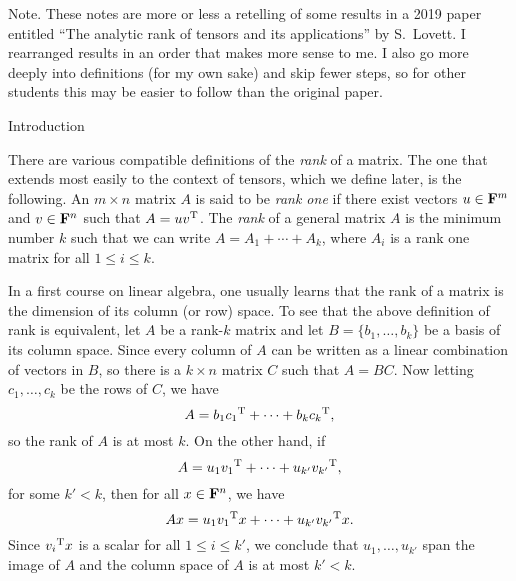 


\def\FF{{\bf F}}
\def\T{{\rm T}}
\def\bias{\op{\rm bias}}
\def\prk{\op{\rm prk}}
\def\ark{\op{\rm ark}}
\def\bar{\overline}
\def\hat{\widehat}
\def\norm#1{|\!|#1|\!|}
\def\bignorm#1{\big|\!\big|#1\big|\!\big|}
\def\Norm#1{\Big|\!\Big|#1\Big|\!\Big|}
\def\normm#1{\bigg|\!\bigg|#1\bigg|\!\bigg|}
\def\x{{\bf x}}
\def\y{{\bf y}}
\def\b{{\bf b}}

\widemargins
{}


 \ninebf Note. \ninepoint These notes are more or less a retelling of
some results in a 2019 paper entitled ``The analytic rank of tensors and its applications'' by
S.~Lovett. I rearranged results in an order that makes more sense to me.
I also go more deeply into definitions (for my own sake) and skip fewer steps,
so for other students this may be easier to
follow than the original paper.

\bigskip

\advsect Introduction

\noindent
There are various compatible definitions of the {\it rank} of a matrix. The one that
extends most easily to the context of tensors, which we define later, is the following.
An $m\times n$ matrix $A$ is said to be {\it rank one} if there exist vectors $u\in \FF^m$
and $v\in \FF^n$ such that $A = uv^\T$. The {\it rank} of a general matrix $A$ is the minimum
number $k$ such that we can write $A = A_1 + \cdots + A_k$, where $A_i$ is a rank one matrix
for all $1\le i\le k$.

In a first course on linear algebra, one usually learns that the rank of a matrix is the
dimension of its column (or row) space. To see that the above definition of rank is equivalent,
let $A$ be a rank-$k$ matrix and let $B = \{b_1, \ldots, b_k\}$
be a basis of its column space. Since every column of $A$
can be written as a linear combination of vectors in $B$, so there is a $k\times n$ matrix $C$
such that $A = BC$. Now letting $c_1, \ldots, c_k$ be the rows of $C$, we have
$$A = b_1{c_1}^\T + \cdots + b_k{c_k}^\T,$$
so the rank of $A$ is at most $k$. On the other hand, if
$$A = u_1{v_1}^\T + \cdots + u_{k'}{v_{k'}}^\T,$$
for some $k'< k$, then for all $x \in \FF^n$, we have
$$Ax = u_1{v_1}^\T x + \cdots + u_{k'}{v_{k'}}^\T x.$$
Since ${v_i}^\T x$ is a scalar for all $1\le i\le k'$, we conclude that $u_1, \ldots, u_{k'}$
span the image of $A$ and the column space of $A$ is at most $k'<k$.

